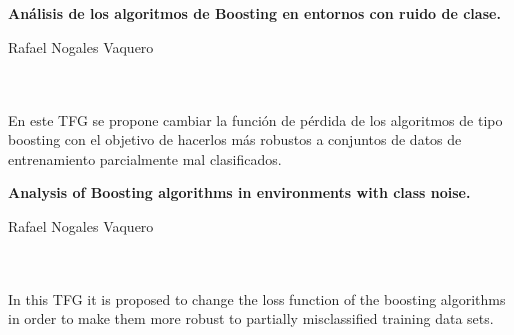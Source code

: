 \chapter*{}






\cleardoublepage
\thispagestyle{empty}

\begin{center}
{\large\bfseries Análisis de los algoritmos de Boosting en entornos con ruido de clase.}\\
\end{center}
\begin{center}
Rafael Nogales Vaquero \\
\end{center}

\\

\vspace{0.7cm}
\\

En este TFG se propone cambiar la función de pérdida de los algoritmos de tipo boosting con el objetivo de hacerlos más robustos a conjuntos de datos de entrenamiento parcialmente mal clasificados.\cleardoublepage


\thispagestyle{empty}


\begin{center}
{\large\bfseries Analysis of Boosting algorithms in environments with class noise.}\\
\end{center}
\begin{center}
Rafael Nogales Vaquero\\
\end{center}

\\

\vspace{0.7cm}
\\

In this TFG it is proposed to change the loss function of the boosting algorithms in order to make them more robust to partially misclassified training data sets.

